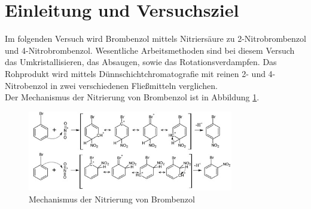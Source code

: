 \section{Einleitung und Versuchsziel}
\label{sec:aufgabenstellung}

Im folgenden Versuch wird Brombenzol mittels Nitriersäure zu 2-Nitrobrombenzol und 4-Nitrobrombenzol. Wesentliche Arbeitsmethoden sind bei diesem Versuch das Umkristallisieren, das Absaugen, sowie das Rotationsverdampfen. Das Rohprodukt wird mittels Dünnschichtchromatografie mit reinen 2- und 4-Nitrobenzol in zwei verschiedenen Fließmitteln verglichen.\\
Der Mechanismus der Nitrierung von Brombenzol ist in Abbildung \ref{fig:mechanismus}.

\begin{figure}[h!]
	\centering
	\includegraphics[width=0.8\textwidth]{img/mechanismus}
	\caption{Mechanismus der Nitrierung von Brombenzol}
	\label{fig:mechanismus}
\end{figure}
\FloatBarrier



